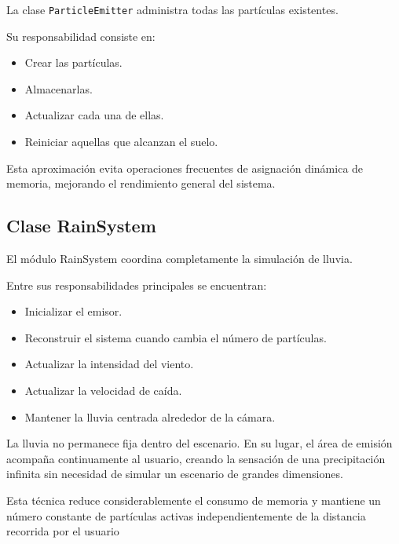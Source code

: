La clase \texttt{ParticleEmitter} administra todas las partículas existentes.

Su responsabilidad consiste en:

\begin{itemize}

\item Crear las partículas.

\item Almacenarlas.

\item Actualizar cada una de ellas.

\item Reiniciar aquellas que alcanzan el suelo.

\end{itemize}

Esta aproximación evita operaciones frecuentes de asignación dinámica de memoria, mejorando el rendimiento general del sistema.

\subsection{Clase RainSystem}

El módulo RainSystem coordina completamente la simulación de lluvia.

Entre sus responsabilidades principales se encuentran:

\begin{itemize}

\item Inicializar el emisor.

\item Reconstruir el sistema cuando cambia el número de partículas.

\item Actualizar la intensidad del viento.

\item Actualizar la velocidad de caída.

\item Mantener la lluvia centrada alrededor de la cámara.

\end{itemize}

La lluvia no permanece fija dentro del escenario. En su lugar, el área de emisión acompaña continuamente al usuario, creando la sensación de una precipitación infinita sin necesidad de simular un escenario de grandes dimensiones.

Esta técnica reduce considerablemente el consumo de memoria y mantiene un número constante de partículas activas independientemente de la distancia recorrida por el usuario


